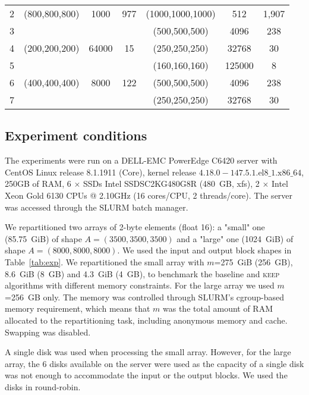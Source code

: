 \documentclass[sigconf, nonacm]{acmart}
\newcommand{\keep}[0]{\textsc{keep}\xspace}
\begin{document}
\begin{table*}
\begin{tabular}{c|ccc|ccc}
   \rowcolor{black!10}
   2 & (800,800,800) & 1000     & 977    & (1000,1000,1000) & 512     &  1,907 \\
   \rowcolor{black!10}
   3 &               &        &           & (500,500,500)  & 4096    & 238 \\
   4 & (200,200,200) & 64000     & 15    & (250,250,250) & 32768     &  30 \\
   5 &               &        &           & (160,160,160)  & 125000    & 8 \\
   \rowcolor{black!10}
   6 & (400,400,400) & 8000     & 122    & (500,500,500) & 4096     &  238 \\
   \rowcolor{black!10}
   7 &               &        &           & (250,250,250)  & 32768    & 30 \\

   \end{tabular}
   \label{tab:exp}
\end{table*}
\subsection{Experiment conditions}
The experiments were run on a DELL-EMC PowerEdge C6420 server
with CentOS Linux release 8.1.1911 (Core), kernel release
$4.18.0-147.5.1.\textrm{el}8\_1.\textrm{x}86\_64$, 250GB of RAM,
6 $\times$ SSDs Intel SSDSC2KG480G8R (480~GB, xfs),
2 $\times$ Intel Xeon Gold 6130 CPUs @ 2.10GHz (16 cores/CPU, 2 threads/core).
The server was accessed through the SLURM batch manager.

We repartitioned two arrays of 2-byte elements (float 16): a "small" one (85.75~GiB)  of shape $A=(3500,3500,3500)$
and a "large" one (1024~GiB) of shape $A=(8000,8000,8000)$.
We used the input and output block shapes in Table~\ref{tab:exp}.
We repartitioned the small array with $m$=275~GiB (256~GB), 8.6~GiB (8~GB)
 and 4.3~GiB (4~GB), to benchmark the baseline and \keep algorithms with different
 memory constraints. For the large array we used $m$=256~GB only.
The memory was controlled through SLURM's cgroup-based memory requirement,
which means that $m$ was the total amount of RAM allocated to the
repartitioning task, including anonymous memory and cache. Swapping was
disabled.

A single disk was used when processing the small array. However, for the
large array, the 6 disks available on the server were used as the capacity of a single disk was not
enough to accommodate the input or the output blocks. We used the disks in
round-robin.
\end{document}
